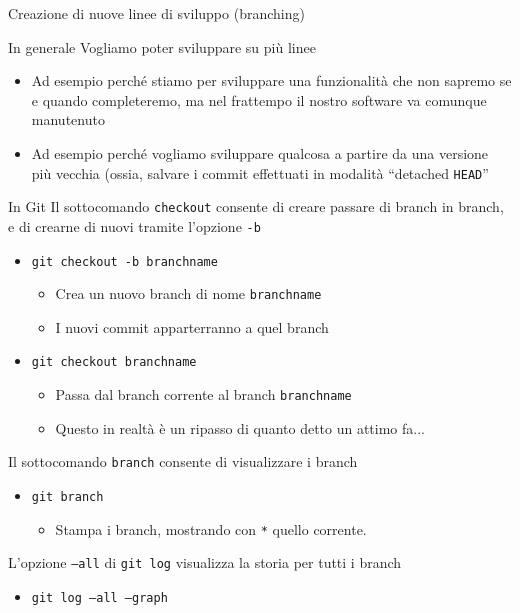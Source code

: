 \documentclass[xcolor=dvipsnames,presentation]{beamer}
\begin{document}
\begin{frame}{Creazione di nuove linee di sviluppo (branching)}
	\begin{block}{In generale}
		Vogliamo poter sviluppare su più linee
		\begin{itemize}
			\item Ad esempio perché stiamo per sviluppare una funzionalità che non sapremo se e quando completeremo, ma nel frattempo il nostro software va comunque manutenuto
			\item Ad esempio perché vogliamo sviluppare qualcosa a partire da una versione più vecchia (ossia, salvare i commit effettuati in modalità ``detached \texttt{HEAD}''
		\end{itemize}
	\end{block}
	\begin{block}{In Git}
		Il sottocomando \texttt{checkout} consente di creare passare di branch in branch, e di crearne di nuovi tramite l'opzione \texttt{-b}
		\begin{itemize}
			\item \texttt{git checkout -b branchname}
			\begin{itemize}
				\item Crea un nuovo branch di nome \texttt{branchname}
				\item I nuovi commit apparterranno a quel branch
			\end{itemize}
			\item \texttt{git checkout branchname}
			\begin{itemize}
				\item Passa dal branch corrente al branch \texttt{branchname}
				\item Questo in realtà è un ripasso di quanto detto un attimo fa...
			\end{itemize}
		\end{itemize}
		Il sottocomando \texttt{branch} consente di visualizzare i branch
		\begin{itemize}
			\item \texttt{git branch}
			\begin{itemize}
				\item Stampa i branch, mostrando con \texttt{*} quello corrente.
			\end{itemize}
		\end{itemize}
		L'opzione \texttt{--all} di \texttt{git log} visualizza la storia per tutti i branch
		\begin{itemize}
			\item \texttt{git log --all --graph}

\end{itemize}
\end{block}
\end{frame}
\end{document}
